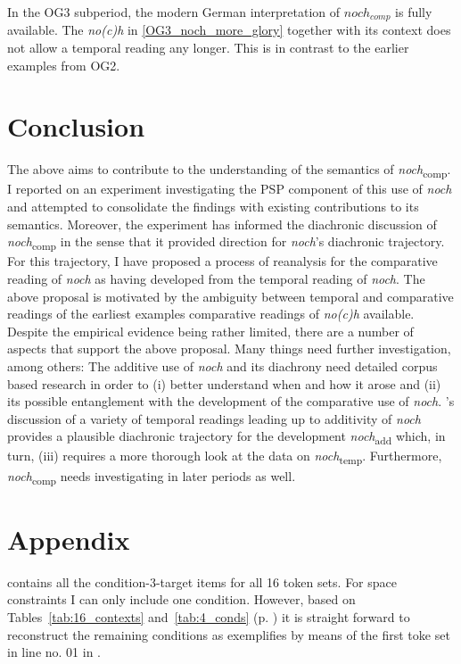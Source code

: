 \documentclass[output=paper
,modfonts
,nonflat]{langsci/langscibook}
\begin{document}
In the OG3 subperiod, the modern German interpretation of $noch_{comp}$ is fully available. The \textit{no(c)h} in \ref{OG3_noch_more_glory} together with its context does not allow a temporal reading any longer. This is in contrast to the earlier examples from OG2.

\section{Conclusion}

The above aims to contribute to the understanding of the semantics of \textit{noch}\textsubscript{comp}. I reported on an experiment investigating the PSP component of this use of \textit{noch} and attempted to consolidate the findings with existing contributions to its semantics. Moreover, the experiment has informed the diachronic discussion of \textit{noch}\textsubscript{comp} in the sense that it provided direction for \textit{noch}'s diachronic trajectory. For this trajectory, I have proposed a process of reanalysis for the comparative reading of \textit{noch} as having developed from the temporal reading of \textit{noch}. The above proposal is motivated by the ambiguity between temporal and comparative readings of the earliest examples comparative readings of \textit{no(c)h} available. Despite the empirical evidence being rather limited, there are a number of aspects that support the above proposal. Many things need further investigation, among others: The additive use of \textit{noch} and its diachrony need detailed corpus based research in order to (i) better understand when and how it arose and (ii) its possible entanglement with the development of the comparative use of \textit{noch}. \citeauthor{beck2016a_sub}'s \citeyearpar{beck2016a_sub} discussion of a variety of temporal readings leading up to additivity of \textit{noch} provides a plausible diachronic trajectory for the development \textit{noch}\textsubscript{add} which, in turn, (iii) requires a more thorough look at the data on \textit{noch}\textsubscript{temp}. Furthermore, \textit{noch}\textsubscript{comp} needs investigating in later periods as well.


{\sloppy\printbibliography[heading=subbibliography,notkeyword=this]}



\section*{Appendix}
 contains all the condition-3-target items for all 16 token sets. For space constraints I can only include one condition. However, based on Tables~\ref{tab:16_contexts} and~\ref{tab:4_conds} (p. \pageref{tab:4_conds}) it is straight forward to reconstruct the remaining conditions as  exemplifies by means of the first toke set in line no. 01 in .
\end{document}
